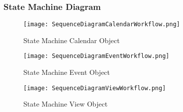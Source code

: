 \newpage
\subsubsection*{State Machine Diagram}
\begin{figure}[ht!]
\centering
\texttt{[image: SequenceDiagramCalendarWorkflow.png]}
\caption{State Machine Calendar Object  \label{overflow}}
\end{figure}

\begin{figure}[ht!]
\centering
\texttt{[image: SequenceDiagramEventWorkflow.png]}
\caption{State Machine Event Object \label{overflow}}
\end{figure}

\newpage
\begin{figure}[ht!]
\centering
\texttt{[image: SequenceDiagramViewWorkflow.png]}
\caption{State Machine View Object  \label{overflow}}
\end{figure}